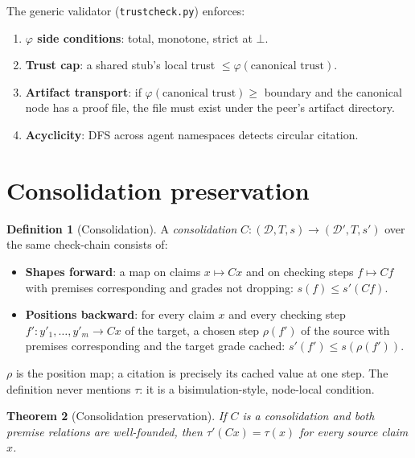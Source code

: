 \documentclass[11pt,a4paper]{article}
\theoremstyle{plain}
\newtheorem{theorem}{Theorem}[section]
\theoremstyle{definition}
\newtheorem{definition}[theorem]{Definition}
\begin{document}
The generic validator (\texttt{trustcheck.py}) enforces:
\begin{enumerate}
\item \textbf{$\varphi$ side conditions}: total, monotone, strict at $\bot$.
\item \textbf{Trust cap}: a shared stub's local trust $\leq \varphi(\text{canonical trust})$.
\item \textbf{Artifact transport}: if $\varphi(\text{canonical trust}) \geq$ boundary and the canonical node has a proof file, the file must exist under the peer's artifact directory.
\item \textbf{Acyclicity}: DFS across agent namespaces detects circular citation.
\end{enumerate}

\section{Consolidation preservation}
\label{sec:consolidation}

\begin{definition}[Consolidation]
\label{def:consolidation}
A \emph{consolidation} $C : ({\mathcal D}, T, s) \to ({\mathcal D}', T, s')$
over the same check-chain consists of:
\begin{itemize}
\item \textbf{Shapes forward}: a map on claims $x \mapsto Cx$ and on
checking steps $f \mapsto Cf$ with premises corresponding and grades not
dropping: $s(f) \leq s'(Cf)$.
\item \textbf{Positions backward}: for every claim $x$ and every checking
step $f' : y'_1, \ldots, y'_m \to Cx$ of the target, a chosen step
$\rho(f')$ of the source with premises corresponding and the target grade
cached: $s'(f') \leq s(\rho(f'))$.
\end{itemize}
\end{definition}

$\rho$ is the position map; a citation is precisely its cached value at
one step. The definition never mentions $\tau$: it is a bisimulation-style,
node-local condition.

\begin{theorem}[Consolidation preservation]
\label{thm:consolidation}
If $C$ is a consolidation and both premise relations are well-founded,
then $\tau'(Cx) = \tau(x)$ for every source claim $x$.
\end{theorem}
\end{document}
